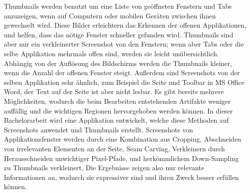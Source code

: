 \documentclass[draft,final]{vutinfth} %
\begin{document}
	
	\frontmatter %
	
	\addstatementpage
	
	\begin{danksagung*}
	\end{danksagung*}
	
	\begin{acknowledgements*}
	\end{acknowledgements*}
	
	\begin{kurzfassung} 
		Thumbnails werden benutzt um eine Liste von geöffneten Fenstern und Tabs anzuzeigen, wenn auf Computern oder mobilen Geräten zwischen ihnen gewechselt wird.
		Diese Bilder erleichtern das Erkennen der offenen Applikationen, und helfen, dass das nötige Fenster schneller gefunden wird.
		Thumbnails sind aber nur ein verkleinerter Screenshot von den Fenstern; wenn aber Tabs oder die selbe Applikation mehrmals offen sind, werden sie leicht unübersichtlich.
		Abhängig von der Auflösung des Bildschirms werden die Thumbnails kleiner, wenn die Anzahl der offenen Fenster steigt.
		Außerdem sind Screenshots von der selben Applikation sehr ähnlich, zum Beispiel die Seite und Toolbar in MS Office Word, der Text auf der Seite ist aber nicht lesbar. 
		Es gibt bereits mehrere Möglichkeiten, wodurch die beim Bearbeiten entstehenden Artifakte weniger auffällig und die wichtigen Regionen hervorgehoben werden können.
		In dieser Bachelorarbeit wird eine Applikation entwickelt, welche diese Methoden auf Screenshots anwendet und Thumbnails erstellt.
		Screenshots von Applikationsfenster werden durch eine Kombination aus Cropping, Abschneiden von irrelevanten Elementen an der Seite, Seam Carving, Verkleinern durch Herausschneiden unwichtiger Pixel-Pfade, und herkömmlichem Down-Sampling zu Thumbnails verkleinert. 
		Die Ergebnisse zeigen also nur relevante Informationen an, wodurch sie expressiver sind und ihren Zweck besser erfüllen können.
		
	\end{kurzfassung}
	
\end{document}
